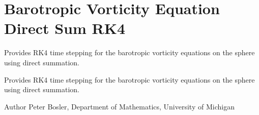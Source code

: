 \hypertarget{group___b_v_e_direct_sum}{\section{Barotropic Vorticity Equation Direct Sum R\+K4}
\label{group___b_v_e_direct_sum}
}


Provides R\+K4 time stepping for the barotropic vorticity equations on the sphere using direct summation.  


Provides R\+K4 time stepping for the barotropic vorticity equations on the sphere using direct summation. 

\begin{DoxyAuthor}{Author}
Peter Bosler, Department of Mathematics, University of Michigan 
\end{DoxyAuthor}
